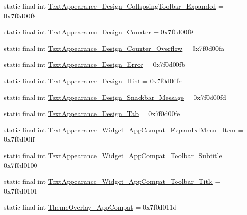 \begin{DoxyCompactItemize}
\item 
static final int \mbox{\hyperlink{classandroid_1_1support_1_1design_1_1_r_1_1style_a4467f1c04bd3fe1131c546ec3b57a5f9}{Text\+Appearance\+\_\+\+Design\+\_\+\+Collapsing\+Toolbar\+\_\+\+Expanded}} = 0x7f0d00f8
\item 
static final int \mbox{\hyperlink{classandroid_1_1support_1_1design_1_1_r_1_1style_a88c783c0b5d4d0703e95a3de58a29d41}{Text\+Appearance\+\_\+\+Design\+\_\+\+Counter}} = 0x7f0d00f9
\item 
static final int \mbox{\hyperlink{classandroid_1_1support_1_1design_1_1_r_1_1style_a3a009f705c884d470f8e7a76912e3a93}{Text\+Appearance\+\_\+\+Design\+\_\+\+Counter\+\_\+\+Overflow}} = 0x7f0d00fa
\item 
static final int \mbox{\hyperlink{classandroid_1_1support_1_1design_1_1_r_1_1style_accab8ab0c293a8370ea192578d8dbcec}{Text\+Appearance\+\_\+\+Design\+\_\+\+Error}} = 0x7f0d00fb
\item 
static final int \mbox{\hyperlink{classandroid_1_1support_1_1design_1_1_r_1_1style_a2b8b92db31ec208aacc3f0d62cedec8b}{Text\+Appearance\+\_\+\+Design\+\_\+\+Hint}} = 0x7f0d00fc
\item 
static final int \mbox{\hyperlink{classandroid_1_1support_1_1design_1_1_r_1_1style_ac85d0ef831a6f8f8ea0ff291900abc78}{Text\+Appearance\+\_\+\+Design\+\_\+\+Snackbar\+\_\+\+Message}} = 0x7f0d00fd
\item 
static final int \mbox{\hyperlink{classandroid_1_1support_1_1design_1_1_r_1_1style_ae7a00e72875b359ac34740afb028c67d}{Text\+Appearance\+\_\+\+Design\+\_\+\+Tab}} = 0x7f0d00fe
\item 
static final int \mbox{\hyperlink{classandroid_1_1support_1_1design_1_1_r_1_1style_a3d3c649896fe547217bf1e3a5f7c2c2e}{Text\+Appearance\+\_\+\+Widget\+\_\+\+App\+Compat\+\_\+\+Expanded\+Menu\+\_\+\+Item}} = 0x7f0d00ff
\item 
static final int \mbox{\hyperlink{classandroid_1_1support_1_1design_1_1_r_1_1style_ab87eda6737968b821619555803a66662}{Text\+Appearance\+\_\+\+Widget\+\_\+\+App\+Compat\+\_\+\+Toolbar\+\_\+\+Subtitle}} = 0x7f0d0100
\item 
static final int \mbox{\hyperlink{classandroid_1_1support_1_1design_1_1_r_1_1style_ad45bedf9c7a7f9f80fc30792d23c9998}{Text\+Appearance\+\_\+\+Widget\+\_\+\+App\+Compat\+\_\+\+Toolbar\+\_\+\+Title}} = 0x7f0d0101
\item 
static final int \mbox{\hyperlink{classandroid_1_1support_1_1design_1_1_r_1_1style_ae88528ab7b6fb65a2a96bef866a513ea}{Theme\+Overlay\+\_\+\+App\+Compat}} = 0x7f0d011d

\end{DoxyCompactItemize}
